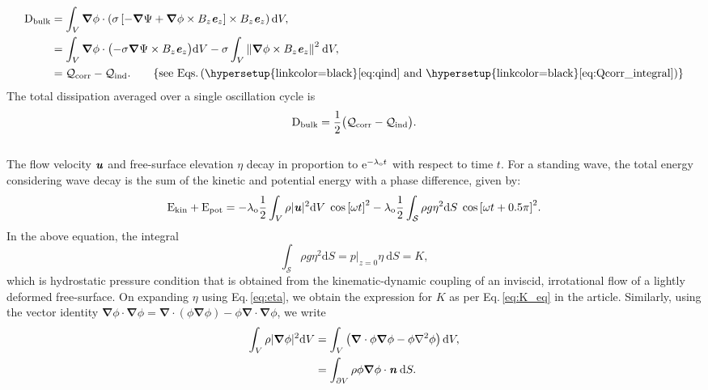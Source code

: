 \documentclass[aps,prfluids,reprint,superscriptaddress]{revtex4-2}
\newcommand{\h}[1]{\textbf{\textit{#1}}}
\newcommand{\ii}[1]{\text{#1}}
\newcommand{\nn}{\nonumber}
\newcommand{\mref}[1]{{\hypersetup{linkcolor=black}\ref{#1}}}
\newcommand{\meqref}[1]{{\hypersetup{linkcolor=black}\eqref{#1}}}
\numberwithin{equation}{section}
\begin{document}
\begin{align}
	\nn
	\ii D_{\rm bulk} &= \int_{V} 
	\bm\nabla\phi \cdot 
	\left( \sigma\left[ -\bm\nabla\Psi + \bm\nabla\phi \times B_z\h e_z \right]
	\times B_z\h e_z \right) \mathrm dV,
	\\
	\nn
	&=  \int_{V}  \bm\nabla\phi \cdot \bigl(
	-\sigma\bm\nabla\Psi \times B_z\h e_z \bigr) \mathrm dV
	- 
	 \sigma\int_{V} \norm{\bm\nabla\phi \times B_z\h e_z}^2 \: \mathrm dV,
	\\
	& = \mathcal{Q}_{\rm corr} - \mathcal{Q}_{\rm ind}. 
	\qquad \{ \ii{see Eqs.\,(\mref{eq:qind} and \mref{eq:Qcorr_integral})} \}
	\label{eq:Dbulk_result}
\end{align}
The total dissipation averaged over a single oscillation cycle is
\begin{equation}
	\ii D_{\rm bulk} = \frac{1}{2} \bigl(\mathcal{Q}_{\rm corr} - \mathcal{Q}_{\rm ind} \bigr).
	\label{eq:Dbulk_avg}
\end{equation}
\\
\indent The flow velocity $\h u$ and free-surface elevation $\eta$ decay in proportion to $\ii e^{-\lambda_{\rm o}t}$ with respect to time $t$. For a standing wave, the total energy considering wave decay is the sum of the kinetic and potential energy with a phase difference, given by:
\begin{equation}
	\ii E_{\rm kin} + \ii E_{\rm pot} = 
	-\lambda_{\rm o} \frac{1}{2} \int_{V} \rho |\h u|^2 \mathrm dV
	\; \cos{[ \omega t ]}^2 
	-  \lambda_{\rm o} \frac{1}{2} \int_{\mathcal{S}}
	\rho g\eta^2 \mathrm dS
	\; \cos{[ \omega t  + 0.5\pi]}^2 .
	\label{eq:kin+pot_integrals}
\end{equation}
In the above equation, the integral 
\begin{equation}
	\int_{\mathcal{S}}
	\rho g\eta^2 \mathrm dS =
	 p|_{z=0} \eta \: \mathrm dS = K,
	\label{eq:young_laplace_integral}
\end{equation}
which is hydrostatic pressure condition that is obtained from the kinematic-dynamic coupling of an inviscid, irrotational flow of a lightly deformed free-surface. On expanding $\eta$ using Eq.\,\meqref{eq:eta}, we obtain the expression for $K$ as per Eq.\,\meqref{eq:K_eq} in the article. Similarly, using the vector identity  $\bm\nabla\phi \cdot \bm\nabla\phi = \bm\nabla\cdot(\phi \bm\nabla\phi) - \phi\bm\nabla\cdot \bm\nabla\phi$, we write
\begin{align}
	\nn
	\int_{V} \rho |\bm\nabla \phi|^2 \mathrm dV &=
	\int_{V} \left(
	\bm\nabla \cdot \phi\bm\nabla\phi - \phi\nabla^2\phi \right) \mathrm dV,
	\\
	&= 
	\int_{\partial V} 
	\rho\phi\bm\nabla\phi\cdot \h n \:\mathrm dS.
	\label{eq:grad_phi_dotn}
\end{align}
\end{document}
